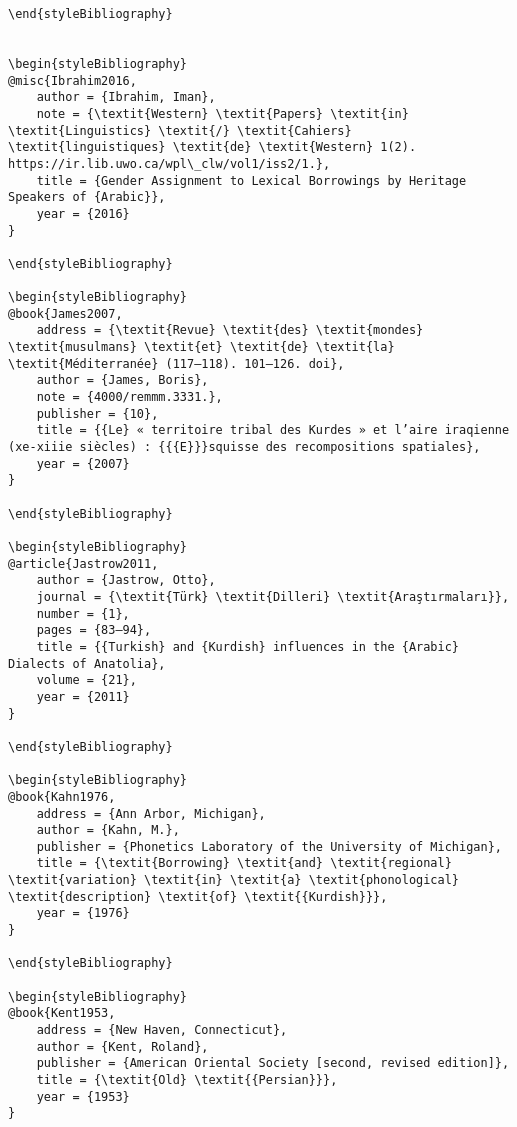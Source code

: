 \documentclass[output=paper]{langsci/langscibook}
\begin{document}
\begin{verbatim}
\end{styleBibliography}


\begin{styleBibliography}
@misc{Ibrahim2016,
	author = {Ibrahim, Iman},
	note = {\textit{Western} \textit{Papers} \textit{in} \textit{Linguistics} \textit{/} \textit{Cahiers} \textit{linguistiques} \textit{de} \textit{Western} 1(2). https://ir.lib.uwo.ca/wpl\_clw/vol1/iss2/1.},
	title = {Gender Assignment to Lexical Borrowings by Heritage Speakers of {Arabic}},
	year = {2016}
}

\end{styleBibliography}

\begin{styleBibliography}
@book{James2007,
	address = {\textit{Revue} \textit{des} \textit{mondes} \textit{musulmans} \textit{et} \textit{de} \textit{la} \textit{Méditerranée} (117–118). 101–126. doi},
	author = {James, Boris},
	note = {4000/remmm.3331.},
	publisher = {10},
	title = {{Le} « territoire tribal des Kurdes » et l’aire iraqienne (xe-xiiie siècles) : {{{E}}}squisse des recompositions spatiales},
	year = {2007}
}

\end{styleBibliography}

\begin{styleBibliography}
@article{Jastrow2011,
	author = {Jastrow, Otto},
	journal = {\textit{Türk} \textit{Dilleri} \textit{Araştırmaları}},
	number = {1},
	pages = {83–94},
	title = {{Turkish} and {Kurdish} influences in the {Arabic} Dialects of Anatolia},
	volume = {21},
	year = {2011}
}

\end{styleBibliography}

\begin{styleBibliography}
@book{Kahn1976,
	address = {Ann Arbor, Michigan},
	author = {Kahn, M.},
	publisher = {Phonetics Laboratory of the University of Michigan},
	title = {\textit{Borrowing} \textit{and} \textit{regional} \textit{variation} \textit{in} \textit{a} \textit{phonological} \textit{description} \textit{of} \textit{{Kurdish}}},
	year = {1976}
}

\end{styleBibliography}

\begin{styleBibliography}
@book{Kent1953,
	address = {New Haven, Connecticut},
	author = {Kent, Roland},
	publisher = {American Oriental Society [second, revised edition]},
	title = {\textit{Old} \textit{{Persian}}},
	year = {1953}
}


\end{verbatim}
\end{document}
